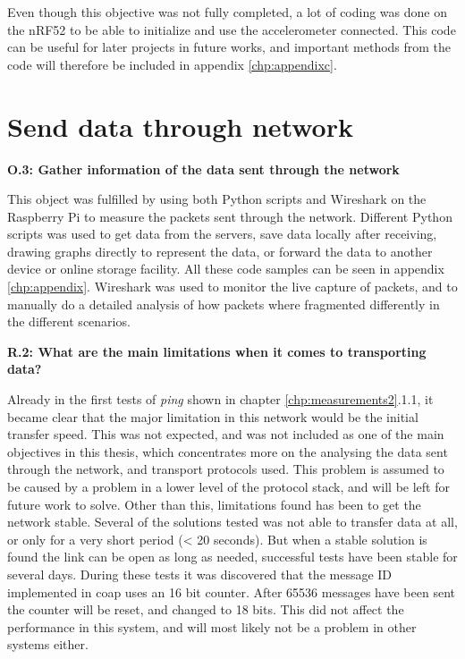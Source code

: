 Even though this objective was not fully completed, a lot of coding was done on the nRF52 to be able to initialize and use the accelerometer connected. This code can be useful for later projects in future works, and important methods from the code will therefore be included in appendix \ref{chp:appendixc}.  



\section{Send data through network}

\noindent\textbf{O.3: Gather information of the data sent through the network}

This object was fulfilled by using both Python scripts and Wireshark on the Raspberry Pi to measure the packets sent through the network. Different Python scripts was used to get data from the servers, save data locally after receiving, drawing graphs directly to represent the data, or forward the data to another device or online storage facility. All these code samples can be seen in appendix \ref{chp:appendix}. Wireshark was used to monitor the live capture of packets, and to manually do a detailed analysis of how packets where fragmented differently in the different scenarios. 

\noindent\textbf{R.2: What are the main limitations when it comes to transporting data?}

Already in the first tests of \textit{ping} shown in chapter \ref{chp:measurements2}.1.1, it became clear that the major limitation in this network would be the initial transfer speed. This was not expected, and was not included as one of the main objectives in this thesis, which concentrates more on the analysing the data sent through the network, and transport protocols used. This problem is assumed to be caused by a problem in a lower level of the protocol stack, and will be left for future work to solve. Other than this, limitations found has been to get the network stable. Several of the solutions tested was not able to transfer data at all, or only for a very short period (< 20 seconds). But when a stable solution is found the link can be open as long as needed, successful tests have been stable for several days. During these tests it was discovered that the message ID implemented in \gls{coap} uses an 16 bit counter. After 65536 messages have been sent the counter will be reset, and changed to 18 bits. This did not affect the performance in this system, and will most likely not be a problem in other systems either. 

